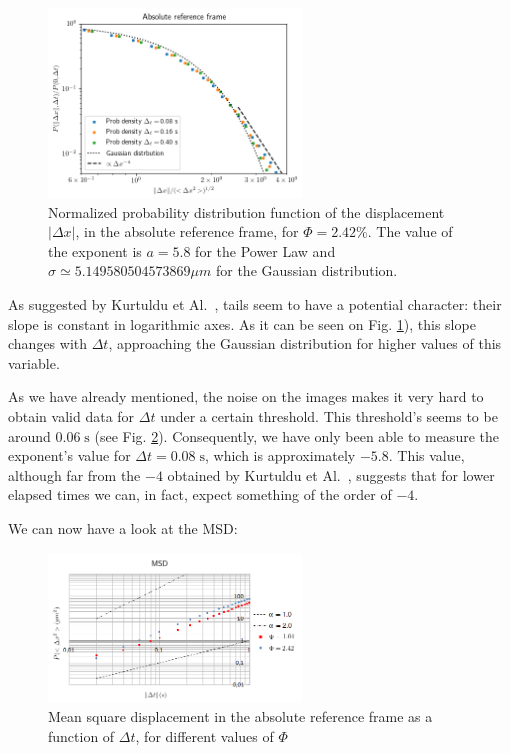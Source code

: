 \begin{figure}[H]
	\centering
	\includegraphics[width=0.6\textwidth]{archivos/TailsANH.png}
	\caption{Normalized probability distribution function of the displacement $|\Delta x|$, in the absolute reference frame, for $\Phi = 2.42\%$. The value of the exponent is $a=5.8$ for the Power Law and $\sigma \simeq 5.149580504573869 \mu m$ for the Gaussian distribution.}
	\label{ANH_Tails}
\end{figure}

As suggested by Kurtuldu et Al.~\cite{Kurtuldu2011}, tails seem to have a potential character: their slope is constant in logarithmic axes. As it can be seen on Fig. \ref{ANH_Tails}), this slope changes with  $\Delta t$, approaching the Gaussian distribution for higher values of this variable.

As we have already mentioned, the noise on the images makes it very hard to obtain valid data for $\Delta t$ under a certain threshold. This threshold's seems to be around $0.06 \; \textrm{s}$ (see Fig. \ref{MSD_ANH}). Consequently, we have only been able to measure the exponent's value for $\Delta t = 0.08 \; \textrm{s}$, which is approximately $-5.8$. This value, although far from the $-4$ obtained by Kurtuldu et Al.~\cite{Kurtuldu2011}, suggests that for lower elapsed times we can, in fact, expect something of the order of $-4$.

We can now have a look at the MSD:

\begin{figure}[H]
	\centering
	\includegraphics[width=0.6\textwidth]{archivos/MSD_ANH.png}
	\caption{Mean square displacement in the absolute reference frame as a function of $\Delta t$, for different values of $\Phi$}
	\label{MSD_ANH}
\end{figure}


